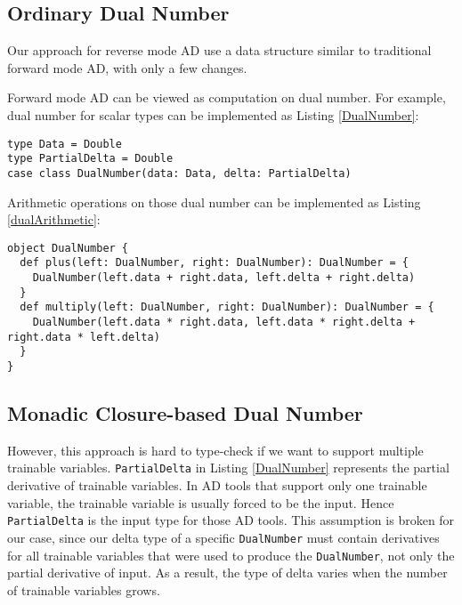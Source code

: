 \subsection{Ordinary Dual Number}
\label{dual number}

Our approach for reverse mode AD use a data structure similar to traditional forward mode AD, with only a few changes.

Forward mode AD can be viewed as computation on dual number. For example, dual number for scalar types can be implemented as Listing \ref{DualNumber}:

\begin{lstlisting}[float={htbp},caption={Dual number for forward mode AD}, label={DualNumber}]
type Data = Double
type PartialDelta = Double
case class DualNumber(data: Data, delta: PartialDelta)
\end{lstlisting}

Arithmetic operations on those dual number can be implemented as Listing \ref{dualArithmetic}:

\begin{lstlisting}[float={htbp},caption={Arithmetic operations on dual number}, label={dualArithmetic}]
object DualNumber {
  def plus(left: DualNumber, right: DualNumber): DualNumber = {
    DualNumber(left.data + right.data, left.delta + right.delta)
  }
  def multiply(left: DualNumber, right: DualNumber): DualNumber = {
    DualNumber(left.data * right.data, left.data * right.delta + right.data * left.delta)
  }
}
\end{lstlisting}

\subsection{Monadic Closure-based Dual Number}
\label{monadic dual number}

However, this approach is hard to type-check if we want to support multiple  \glspl{trainable variable}. \lstinline{PartialDelta} in Listing \ref{DualNumber} represents the partial derivative of \glspl{trainable variable}. In AD tools that support only one \gls{trainable variable}, the \gls{trainable variable} is usually forced to be the input. Hence \lstinline{PartialDelta} is the input type for those AD tools. This assumption is broken for our case, since our delta type of a specific \lstinline{DualNumber} must contain derivatives for all \glspl{trainable variable} that were used to produce the \lstinline{DualNumber}, not only the partial derivative of input. As a result, the type of delta varies when the number of \glspl{trainable variable} grows.


